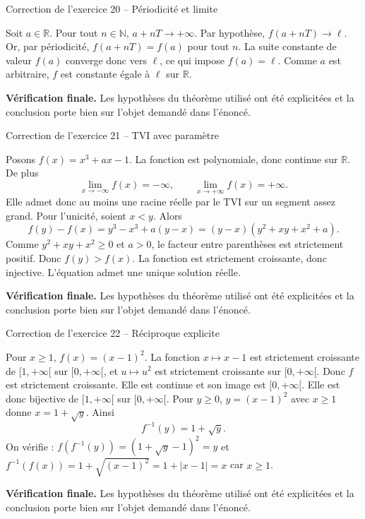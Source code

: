 \documentclass[11pt,a4paper]{article}
\newcommand{\R}{\mathbb{R}}
\newcommand{\N}{\mathbb{N}}
\begin{document}
\begin{corrbox}{Correction de l'exercice 20 -- Périodicité et limite}

Soit $a\in\R$. Pour tout $n\in\N$, $a+nT\to+\infty$. Par hypothèse, $f(a+nT)\to\ell$. Or, par périodicité, $f(a+nT)=f(a)$ pour tout $n$. La suite constante de valeur $f(a)$ converge donc vers $\ell$, ce qui impose $f(a)=\ell$. Comme $a$ est arbitraire, $f$ est constante égale à $\ell$ sur $\R$.

\medskip
\textbf{Vérification finale.} Les hypothèses du théorème utilisé ont été explicitées et la conclusion porte bien sur l'objet demandé dans l'énoncé.
\end{corrbox}


\begin{corrbox}{Correction de l'exercice 21 -- TVI avec paramètre}

Posons $f(x)=x^3+ax-1$. La fonction est polynomiale, donc continue sur $\R$. De plus
\[
\lim_{x\to-\infty}f(x)=-\infty,\qquad \lim_{x\to+\infty}f(x)=+\infty.
\]
Elle admet donc au moins une racine réelle par le TVI sur un segment assez grand. Pour l'unicité, soient $x<y$. Alors
\[
f(y)-f(x)=y^3-x^3+a(y-x)=(y-x)(y^2+xy+x^2+a).
\]
Comme $y^2+xy+x^2\geq0$ et $a>0$, le facteur entre parenthèses est strictement positif. Donc $f(y)>f(x)$. La fonction est strictement croissante, donc injective. L'équation admet une unique solution réelle.

\medskip
\textbf{Vérification finale.} Les hypothèses du théorème utilisé ont été explicitées et la conclusion porte bien sur l'objet demandé dans l'énoncé.
\end{corrbox}


\begin{corrbox}{Correction de l'exercice 22 -- Réciproque explicite}

Pour $x\geq1$, $f(x)=(x-1)^2$. La fonction $x\mapsto x-1$ est strictement croissante de $[1,+\infty[$ sur $[0,+\infty[$, et $u\mapsto u^2$ est strictement croissante sur $[0,+\infty[$. Donc $f$ est strictement croissante. Elle est continue et son image est $[0,+\infty[$. Elle est donc bijective de $[1,+\infty[$ sur $[0,+\infty[$. Pour $y\geq0$, $y=(x-1)^2$ avec $x\geq1$ donne $x=1+\sqrt y$. Ainsi
\[
f^{-1}(y)=1+\sqrt y.
\]
On vérifie : $f(f^{-1}(y))=(1+\sqrt y-1)^2=y$ et $f^{-1}(f(x))=1+\sqrt{(x-1)^2}=1+|x-1|=x$ car $x\geq1$.

\medskip
\textbf{Vérification finale.} Les hypothèses du théorème utilisé ont été explicitées et la conclusion porte bien sur l'objet demandé dans l'énoncé.
\end{corrbox}
\end{document}
